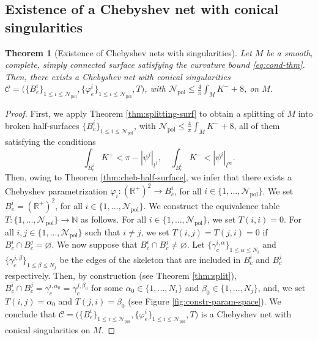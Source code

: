 \documentclass{article}
\newcommand{\R}{\mathbb{R}}
\newcommand{\surf}{M}
\newcommand{\EN}{\mathbb{N}}
\newcommand{\halfP}{B}
\newcommand{\Npol}{\mathcal{N}_{\mathrm{pol}}}
\newtheorem{theorem}{Theorem}
\theoremstyle{remark}
\theoremstyle{prpart}
\newcommand{\CC}{\mathcal{C}}
\begin{document}
\subsection{Existence of a Chebyshev net with conical singularities} \label{subsubsec:cheb-net-bifurc}
\begin{theorem}[Existence of Chebyshev nets with singularities]\label{thm:exist-cheb-sing}
    Let $\surf$ be a smooth, complete, simply connected surface satisfying the curvature bound \eqref{eq:cond-thm}. %
Then, there exists a Chebyshev net with conical singularities $\CC=\big(\{\halfP^i_e\}_{1\leq i\leq \Npol}, \{\varphi^i_e\}_{1\leq i\leq \Npol}, T\big)$, with $\Npol\leq \frac{4}{\pi}\int_\surf K^-+8$, on $\surf$.
\end{theorem}
\begin{proof}
  First, we apply Theorem \ref{thm:splitting-surf} to obtain a splitting of $\surf$ into broken half-surfaces $\{\halfP^i_c\}_{1\leq i\leq \Npol}$, with $\Npol\leq \frac{4}{\pi}\int_\surf K^-+8$, all of them satisfying the conditions
  \begin{equation*} 
    \int_{\halfP^i_c} K^+ < \pi-|\psi^i|_{l^1}, \quad\int_{\halfP^i_c} K^- < |\psi^i|_{l^\infty}.
  \end{equation*} 
  Then, owing to Theorem \ref{thm:cheb-half-surface}, we infer that there exists a Chebyshev parametrization $\varphi_i : (\R^+)^2\to \halfP_c^i$, for all $i\in\{1,...,\Npol\}$. We set $\halfP_e^i = (\R^+)^2$, for all $i\in\{1,...,\Npol\}$. We construct the equivalence table $T:\{1,...,\Npol\}\to\EN$ as follows. For all $i\in\{1,...,\Npol\}$, we set $T(i,i) = 0$. For all $i,j\in\{1,...,\Npol\}$ such that $i\neq j$, we set $T(i,j) = T(j,i)=0$ if $\halfP_c^i\cap\halfP_c^j=\varnothing$.
  We now suppose that $\halfP_c^i\cap\halfP_c^j\neq\varnothing$. Let $\{\gamma_c^{i,\alpha}\}_{1\leq\alpha\leq N_i}$ and $\{\gamma_c^{j,\beta}\}_{1\leq\beta\leq N_j}$ 
be the edges of the skeleton that are included in $\halfP^i_c$ and $\halfP^j_c$ respectively. Then, by construction (see Theorem \ref{thm:split}), $\halfP_c^i\cap\halfP_c^j=\gamma_c^{i,\alpha_0}=\gamma_c^{j,\beta_0}$ for some $\alpha_0\in\{1,...,N_i\}$ and $\beta_0\in\{1,...,N_j\}$, and, we set $T(i,j) = \alpha_0$ and $T(j,i) = \beta_0$ (see Figure \ref{fig:constr-param-space}). We conclude that $\CC=\big(\{\halfP^i_e\}_{1\leq i\leq \Npol}, \{\varphi^i_e\}_{1\leq i\leq \Npol}, T)$ is a Chebyshev net with conical singularities on $\surf$.
\end{proof}
\end{document}

